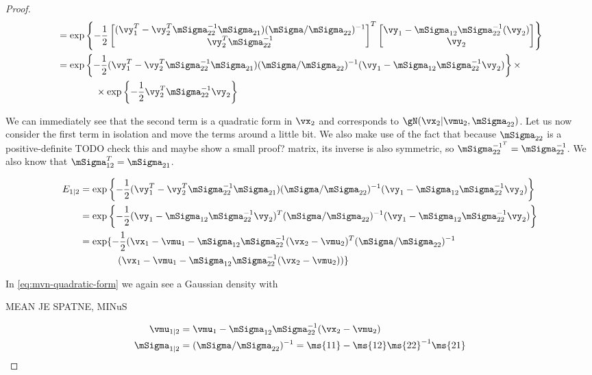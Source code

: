 \begin{proof}
\begin{align}
        &= \exp \left\lbrace -\frac{1}{2}
        \begin{bmatrix} (\vy_1^T - \vy_2^T \mSigma_{22}^{-1} \mSigma_{21}) (\mSigma/\mSigma_{22})^{-1} \\
        \vy_2^T \mSigma_{22}^{-1}
        \end{bmatrix}^T
        \begin{bmatrix} \vy_1 -\mSigma_{12} \mSigma_{22}^{-1} (\vy_2) \\ \vy_2 \end{bmatrix}
        \right\rbrace \\
        &= \exp \left\lbrace -\frac{1}{2}
        (\vy_1^T - \vy_2^T \mSigma_{22}^{-1} \mSigma_{21}) (\mSigma/\mSigma_{22})^{-1} (\vy_1 -\mSigma_{12} \mSigma_{22}^{-1} \vy_2)
        \right\rbrace \times \\
        & \qquad\qquad \times \exp \left\lbrace -\frac{1}{2} \vy_2^T \mSigma_{22}^{-1} \vy_2 \right\rbrace \nonumber
    \end{align}

    We can immediately see that the second term is a quadratic form in $\vx_2$
    and corresponds to $\gN(\vx_2 | \vmu_2, \mSigma_{22})$. Let us now consider
    the first term in isolation and move the terms around a little bit. We also
    make use of the fact that because $\mSigma_{22}$ is a positive-definite
    {TODO check this and maybe show a small proof?} matrix, its inverse is also
    symmetric, so $\mSigma^{-1^T}_{22} = \mSigma^{-1}_{22}$. We also know that
    $\mSigma^T_{12} = \mSigma_{21}$.

    \begin{align}
        E_{1|2} &= \exp \left\lbrace -\frac{1}{2}
        (\vy_1^T - \vy_2^T \mSigma_{22}^{-1} \mSigma_{21}) (\mSigma/\mSigma_{22})^{-1} (\vy_1 -\mSigma_{12} \mSigma_{22}^{-1} \vy_2) \right\rbrace \\
        &= \exp \left\lbrace -\frac{1}{2}
        (\vy_1 - \mSigma_{12}\mSigma_{22}^{-1} \vy_2)^T (\mSigma/\mSigma_{22})^{-1} (\vy_1 -\mSigma_{12} \mSigma_{22}^{-1} \vy_2) \right\rbrace \\
        &= \exp \{ -\frac{1}{2}
        (\vx_1 - \vmu_1 - \mSigma_{12}\mSigma_{22}^{-1} (\vx_2 - \vmu_2)^T (\mSigma/\mSigma_{22})^{-1} \\
        & \hspace{40pt} (\vx_1 - \vmu_1 -\mSigma_{12} \mSigma_{22}^{-1} (\vx_2 - \vmu_2)) \}
        \label{eq:mvn-quadratic-form-12}
    \end{align}

    In \eqref{eq:mvn-quadratic-form} we again see a Gaussian density with

    MEAN JE SPATNE, MINuS

    \begin{align}
        \vmu_{1|2} &= \vmu_1 - \mSigma_{12}\mSigma_{22}^{-1} (\vx_2 - \vmu_2) \\
        \mSigma_{1|2} &= (\mSigma/\mSigma_{22})^{-1} =  \ms{11} - \ms{12} \ms{22}^{-1} \ms{21}
    \end{align}
\end{proof}



